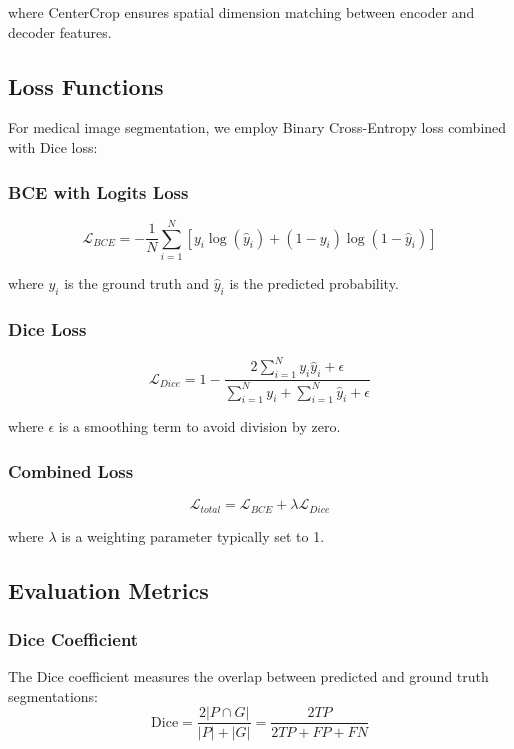 \documentclass[a4paper, journal]{IEEEtran}
\begin{document}
where CenterCrop ensures spatial dimension matching between encoder and decoder features.

\subsection{Loss Functions}
For medical image segmentation, we employ Binary Cross-Entropy loss combined with Dice loss:

\subsubsection{BCE with Logits Loss}
\begin{equation}
    \mathcal{L}_{BCE} = -\frac{1}{N} \sum_{i=1}^{N} [y_i \log(\hat{y}_i) + (1-y_i) \log(1-\hat{y}_i)]
\end{equation}

where $y_i$ is the ground truth and $\hat{y}_i$ is the predicted probability.
\subsubsection{Dice Loss}
\begin{equation}
    \mathcal{L}_{Dice} = 1 - \frac{2 \sum_{i=1}^{N} y_i \hat{y}_i + \epsilon}{\sum_{i=1}^{N} y_i + \sum_{i=1}^{N} \hat{y}_i + \epsilon}
\end{equation}

where $\epsilon$ is a smoothing term to avoid division by zero.

\subsubsection{Combined Loss}
\begin{equation}
    \mathcal{L}_{total} = \mathcal{L}_{BCE} + \lambda \mathcal{L}_{Dice}
\end{equation}

where $\lambda$ is a weighting parameter typically set to 1.

\subsection{Evaluation Metrics}

\subsubsection{Dice Coefficient}
The Dice coefficient measures the overlap between predicted and ground truth segmentations:
\begin{equation}
    \text{Dice} = \frac{2|P \cap G|}{|P| + |G|} = \frac{2TP}{2TP + FP + FN}
\end{equation}
\end{document}
